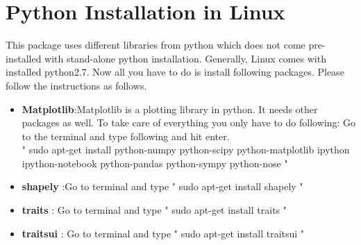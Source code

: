 \documentclass[12pt]{article}
\begin{document}
\section{Python Installation in Linux}
This package uses different libraries from python which does not come pre-installed with stand-alone python installation. Generally, Linux comes with installed python2.7. Now all you have to do is install following packages. Please follow the instructions as follows.
\begin{itemize} 
\item \textbf{Matplotlib}:Matplotlib is a plotting library in python. It needs other packages as well. To take care of everything you only have to do following:
Go to the terminal and type following and hit enter.\\
" sudo apt-get install python-numpy python-scipy python-matplotlib ipython ipython-notebook python-pandas python-sympy python-nose "
\item \textbf{shapely} :Go to terminal and type " sudo apt-get install shapely "
\item \textbf{traits} : Go to terminal and type " sudo apt-get install traits "
\item \textbf{traitsui} : Go to terminal and type " sudo apt-get install traitsui "
\end{itemize}


\end{document}
